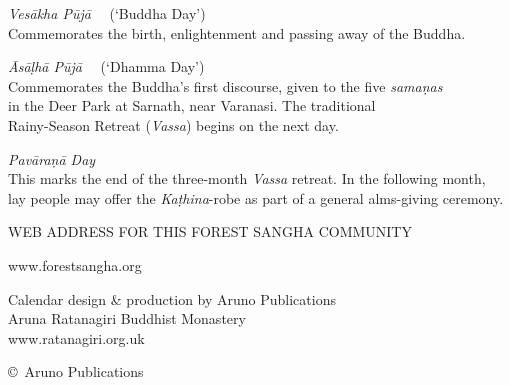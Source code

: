 {{\emph{Vesākha Pūjā} \spacedcdot\ \xDateVesakha\ (`Buddha Day')\\
Commemorates the birth, enlightenment and passing away of the Buddha.

\emph{Āsāḷhā Pūjā} \spacedcdot\ \xDateAsalha\ (`Dhamma Day')\\
Commemorates the Buddha's first discourse, given to the five \emph{samaṇas}\\
in the Deer Park at Sarnath, near Varanasi. The traditional\\
Rainy-Season Retreat (\emph{Vassa}) begins on the next day.

\emph{Pavāraṇā Day} \spacedcdot\ \xDatePavarana\\
This marks the end of the three-month \emph{Vassa} retreat. In the following month,\\
lay people may offer the \emph{Kaṭhina}-robe as part of a general alms-giving ceremony.

\bigskip

{\large WEB ADDRESS FOR THIS FOREST SANGHA COMMUNITY}

www.forestsangha.org

\bigskip

Calendar design \& production by Aruno Publications\\
Aruna Ratanagiri Buddhist Monastery\\
www.ratanagiri.org.uk

\copyright\ Aruno Publications \CopyrightYear\\

\vfill
\mbox{}
}}

